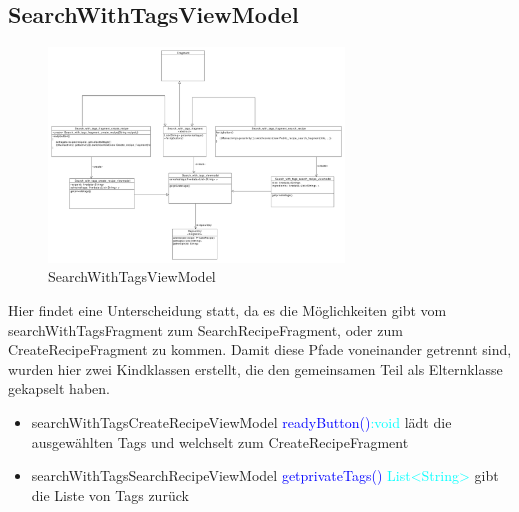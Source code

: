\subsection{SearchWithTagsViewModel}
\begin{figure}[H]
	\centering
	\includegraphics[width=0.7\textwidth]{pics/viewModel/Search_With_Tags_ViewModel.pdf}%
	\caption{SearchWithTagsViewModel}%
	\label{viewModel}%
\end{figure}
Hier findet eine Unterscheidung statt, da es die Möglichkeiten gibt vom searchWithTagsFragment zum SearchRecipeFragment, oder zum CreateRecipeFragment zu kommen. Damit diese Pfade voneinander getrennt sind, wurden hier zwei Kindklassen erstellt, die den gemeinsamen Teil als Elternklasse gekapselt haben.
\begin{itemize}
	\item searchWithTagsCreateRecipeViewModel
	\subitem \textcolor{blue}{readyButton()}\textcolor{cyan}{:void} lädt die ausgewählten Tags und welchselt zum CreateRecipeFragment 
	\item searchWithTagsSearchRecipeViewModel
	\subitem \textcolor{blue}{getprivateTags()} \textcolor{cyan}{List<String>}
	gibt die Liste von Tags zurück
	
\end{itemize}


